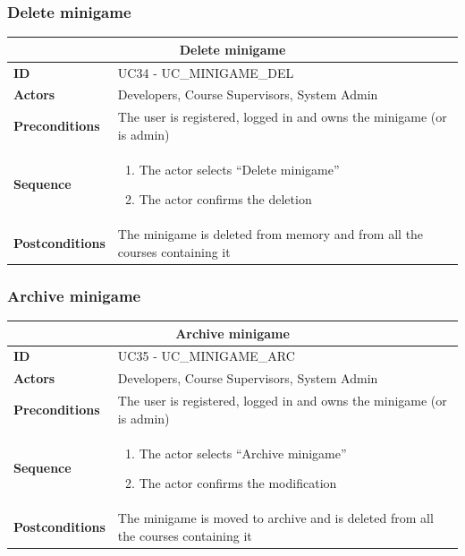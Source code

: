 \subsubsection{Delete minigame}
\begin{tabular}{|m{2.5cm}|m{8cm}|}
	\hline
	\multicolumn{2}{|c|}{Delete minigame} \\
	\hline
	\textbf{ID} & UC34 - UC\_MINIGAME\_DEL \\
	\hline
	\textbf{Actors} & Developers, Course Supervisors, System Admin \\
	\hline
	\textbf{Preconditions} & The user is registered, logged in and owns the minigame (or is admin) \\
	\hline
	\textbf{Sequence} & 
	\begin{enumerate}
		\item The actor selects “Delete minigame”
		\item The actor confirms the deletion
	\end{enumerate} \\
	\hline
	\textbf{Postconditions} & The minigame is deleted from memory and from all the courses containing it \\
	\hline
\end{tabular}

\subsubsection{Archive minigame}
\begin{tabular}{|m{2.5cm}|m{8cm}|}
	\hline
	\multicolumn{2}{|c|}{Archive minigame} \\
	\hline
	\textbf{ID} & UC35 - UC\_MINIGAME\_ARC \\
	\hline
	\textbf{Actors} & Developers, Course Supervisors, System Admin \\
	\hline
	\textbf{Preconditions} & The user is registered, logged in and owns the minigame (or is admin) \\
	\hline
	\textbf{Sequence} & 
	\begin{enumerate}
		\item The actor selects “Archive minigame”
		\item The actor confirms the modification
	\end{enumerate} \\
	\hline
	\textbf{Postconditions} & The minigame is moved to archive and is deleted from all the courses containing it \\
	\hline
\end{tabular}

